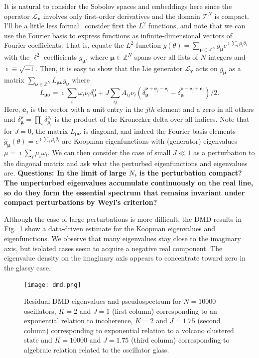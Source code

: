 \documentclass[aps,pre,amsmath,amssymb,floatfix,onecolumn,notitlepage,10pt]{revtex4-1}
\begin{document}
It is natural to consider the Sobolov spaces and embeddings here since the operator $\mathcal{L}_\mathbf{v}$ involves only first-order derivatives and the domain $\mathcal{T}^N$ is compact.   I'll be a little less formal...consider first the $L^2$ functions, and note that we can use the Fourier basis to express functions as infinite-dimensional vectors of Fourier coefficients. That is, equate the $L^2$ function $g(\theta)=\sum_{\bm{\mu}\in\mathbb{Z}^N} g_{\bm{\mu}} e^{ \imath \sum_i \mu_i\theta_i}$ with the $\ell^2$ coefficients $g_{\bm{\mu}}$, where $\bm{\mu}\in \mathbb{Z}^N$ spans over all lists of $N$ integers and $ \imath\equiv \sqrt{-1}$. Then, it is easy to show that the Lie generator $\mathcal{L}_\mathbf{v}$ acts on $g_{\bm{\mu}}$ as a matrix $\sum_{\bm{\nu}\in\mathbb{Z}^N} L_{\bm{\mu} \bm{\nu}}g_{\bm{\nu}}$ where 
\begin{equation}
L_{\bm{\mu} \bm{\nu}} = \imath \sum_i \omega_i \nu_i \delta_{\bm{\mu}}^{\bm{\nu}} + J \sum_{ij} A_{ij} \nu_i (\delta_{\bm{\mu}}^{\bm{\nu}+\bm{e}_j-\bm{e}_i}-\delta_{\bm{\mu}}^{\bm{\nu}-\bm{e}_j+\bm{e}_i})/2.
\end{equation}
Here, $\mathbf{e}_j$ is the vector with a unit entry in the $jth$ element and a zero in all others and $\delta_{\bm{\mu}}^{\bm{\nu}}=\prod_i \delta_{\mu_i}^{\nu_i}$ is the product of the Kronecker delta over all indices.    
Note that for $J=0$, the matrix $L_{\bm{\mu} \bm{\nu}}$ is diagonal, and indeed the Fourier basis elements $\hat{g}_{\bm{\mu}}(\theta) = e^{ \imath\sum_i \mu_i \theta_i}$ are Koopman eigenfunctions with (generator) eigenvalues $\mu =  \imath \sum_i \mu_i \omega_i$.  We can then consider the case of small $J\ll 1$ as a perturbation to the diagonal matrix and ask what the perturbed eigenfunctions and eigenvalues are.  {\bf Questions: In the limit of large $N$, is the perturbation compact? The unperturbed eigenvalues accumulate continuously on the real line, so do they form the essential spectrum that remains invariant under compact perturbations by Weyl's criterion?}

Although the case of large perturbations is more difficult, the DMD results in Fig.~\ref{fig4} show a data-driven estimate for the Koopman eigenvalues and eigenfunctions.  We observe that many eigenvalues stay close to the imaginary axis, but isolated cases seem to acquire a negative real component. The eigenvalue density on the imaginary axis appears to concentrate toward zero in the glassy case.

\begin{figure}[hbt]
\texttt{[image: dmd.png]}
\caption{Residual DMD eigenvalues and pseudospectrum for $N=10000$ oscillators, $K=2$ and $J=1$ (first column) corresponding to an exponential relation to incoherence, $K=2$ and $J=1.75$ (second column) corresponding to exponential relation to a volcano clustered state and $K=10000$ and $J=1.75$ (third column) corresponding to algebraic relation related to the oscillator glass. \label{fig4}}
\end{figure} 
\clearpage
\end{document}
